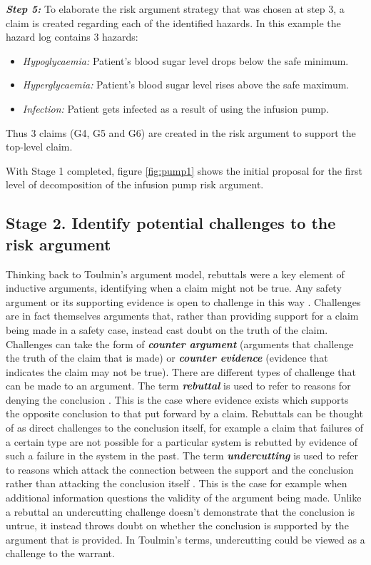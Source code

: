 \textbf{\textit{Step 5:}} To elaborate the risk argument strategy that was chosen at step 3, a claim is created regarding each of the identified hazards. In this example the hazard log contains 3 hazards:
\begin{itemize}
    \item \textit{Hypoglycaemia:} Patient's blood sugar level drops below the safe minimum.
    \item \textit{Hyperglycaemia:} Patient's blood sugar level rises above the safe maximum.
    \item \textit{Infection:} Patient gets infected as a result of using the infusion pump.
\end{itemize}

Thus 3 claims (G4, G5 and G6) are created in the risk argument to support the top-level claim.

With Stage 1 completed, figure \ref{fig:pump1} shows the initial proposal for the first level of decomposition of the infusion pump risk argument.

\subsection{Stage 2. Identify potential challenges to the risk argument}

Thinking back to Toulmin's argument model, rebuttals were a key element of inductive arguments, identifying when a claim might not be true. Any safety argument or its supporting evidence is open to challenge in this way \cite{kelly2007reviewing}. Challenges are in fact themselves arguments that, rather than providing support for a claim being made in a safety case, instead cast doubt on the truth of the claim. Challenges can take the form of \textbf{\textit{counter argument}} (arguments that challenge the truth of the claim that is made) or \textbf{\textit{counter evidence}} (evidence that indicates the claim may not be true). There are different types of challenge that can be made to an argument. The term \textbf{\textit{rebuttal}} is used to refer to reasons for denying the conclusion \cite{pollock1987defeasible}. This is the case where evidence exists which supports the opposite conclusion to that put forward by a claim. Rebuttals can be thought of as direct challenges to the conclusion itself, for example a claim that failures of a certain type are not possible for a particular system is rebutted by evidence of such a failure in the system in the past. The term \textbf{\textit{undercutting}} is used to refer to reasons which attack the connection between the support and the conclusion rather than attacking the conclusion itself \cite{pollock1987defeasible}. This is the case for example when additional information questions the validity of the argument being made. Unlike a rebuttal an undercutting challenge doesn't demonstrate that the conclusion is untrue, it instead throws doubt on whether the conclusion is supported by the argument that is provided. In Toulmin's terms, undercutting could be viewed as a challenge to the warrant.

